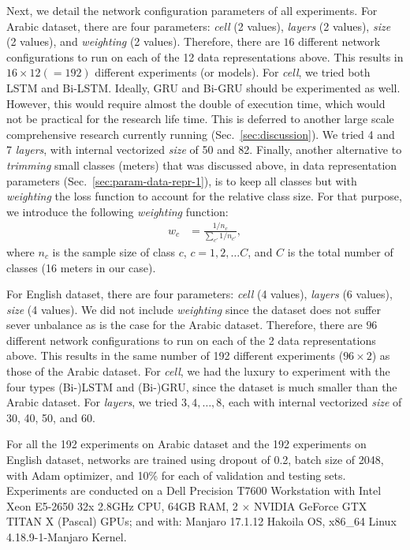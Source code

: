 Next, we detail the network configuration parameters of all experiments. For Arabic dataset, there
are four parameters: \textit{cell} (2 values), \textit{layers} (2 values), \textit{size} (2
values), and \textit{weighting} (2 values). Therefore, there are $16$ different network
configurations to run on each of the 12 data representations above. This results in
$16 \times 12 (=192)$ different experiments (or models). For \textit{cell}, we tried both LSTM and
Bi-LSTM\@. Ideally, GRU and Bi-GRU should be experimented as well. However, this would require
almost the double of execution time, which would not be practical for the research life time. This
is deferred to another large scale comprehensive research currently running
(Sec.~\ref{sec:discussion}). We tried 4 and 7 \textit{layers}, with internal vectorized
\textit{size} of 50 and 82. Finally, another alternative to \textit{trimming} small classes (meters)
that was discussed above, in data representation parameters (Sec.~\ref{sec:param-data-repr-1}), is
to keep all classes but with \textit{weighting} the loss function to account for the relative class
size. For that purpose, we introduce the following \textit{weighting} function:%
\begin{align}
  w_c &= \frac{1/n_c}{\sum_{c'} 1/n_{c'}}, \label{eq:1}
\end{align}%
where $n_c$ is the sample size of class $c$, $c = 1, 2, \ldots C$, and $C$ is the total number of
classes (16 meters in our case).

For English dataset, there are four parameters: \textit{cell} (4 values), \textit{layers} (6
values), \textit{size} (4 values). We did not include \textit{weighting} since the dataset does not
suffer sever unbalance as is the case for the Arabic dataset. Therefore, there are $96$ different
network configurations to run on each of the 2 data representations above. This results in the same
number of 192 different experiments ($96 \times 2$) as those of the Arabic dataset. For
\textit{cell}, we had the luxury to experiment with the four types (Bi-)LSTM and (Bi-)GRU, since the
dataset is much smaller than the Arabic dataset. For \textit{layers}, we tried $3,4,\ldots, 8$, each
with internal vectorized \textit{size} of 30, 40, 50, and 60.

\bigskip

For all the 192 experiments on Arabic dataset and the 192 experiments on English dataset, networks
are trained using dropout of 0.2, batch size of 2048, with Adam optimizer, and 10\% for each of
validation and testing sets. Experiments are conducted on a Dell Precision T7600 Workstation with
Intel Xeon E5-2650 32x 2.8GHz CPU, 64GB RAM, 2 $\times$ NVIDIA GeForce GTX TITAN X (Pascal) GPUs;
and with: Manjaro 17.1.12 Hakoila OS, x86\_64 Linux 4.18.9-1-Manjaro Kernel.
